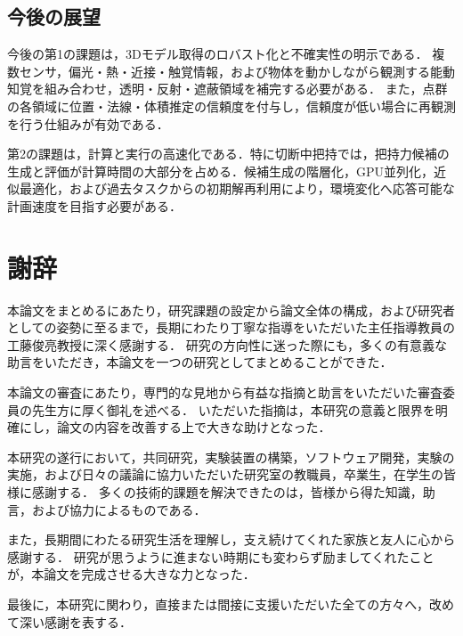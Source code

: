 \section{今後の展望}
\label{sec:conclusion_future}

今後の第1の課題は，3Dモデル取得のロバスト化と不確実性の明示である．
複数センサ，偏光・熱・近接・触覚情報，および物体を動かしながら観測する能動知覚を組み合わせ，透明・反射・遮蔽領域を補完する必要がある．
また，点群の各領域に位置・法線・体積推定の信頼度を付与し，信頼度が低い場合に再観測を行う仕組みが有効である．

第2の課題は，計算と実行の高速化である．特に切断中把持では，把持力候補の生成と評価が計算時間の大部分を占める．候補生成の階層化，GPU並列化，近似最適化，および過去タスクからの初期解再利用により，環境変化へ応答可能な計画速度を目指す必要がある．


\chapter*{謝辞}

本論文をまとめるにあたり，研究課題の設定から論文全体の構成，および研究者としての姿勢に至るまで，長期にわたり丁寧な指導をいただいた主任指導教員の工藤俊亮教授に深く感謝する．
研究の方向性に迷った際にも，多くの有意義な助言をいただき，本論文を一つの研究としてまとめることができた．

本論文の審査にあたり，専門的な見地から有益な指摘と助言をいただいた審査委員の先生方に厚く御礼を述べる．
いただいた指摘は，本研究の意義と限界を明確にし，論文の内容を改善する上で大きな助けとなった．

本研究の遂行において，共同研究，実験装置の構築，ソフトウェア開発，実験の実施，および日々の議論に協力いただいた研究室の教職員，卒業生，在学生の皆様に感謝する．
多くの技術的課題を解決できたのは，皆様から得た知識，助言，および協力によるものである．

また，長期間にわたる研究生活を理解し，支え続けてくれた家族と友人に心から感謝する．
研究が思うように進まない時期にも変わらず励ましてくれたことが，本論文を完成させる大きな力となった．

最後に，本研究に関わり，直接または間接に支援いただいた全ての方々へ，改めて深い感謝を表する．

